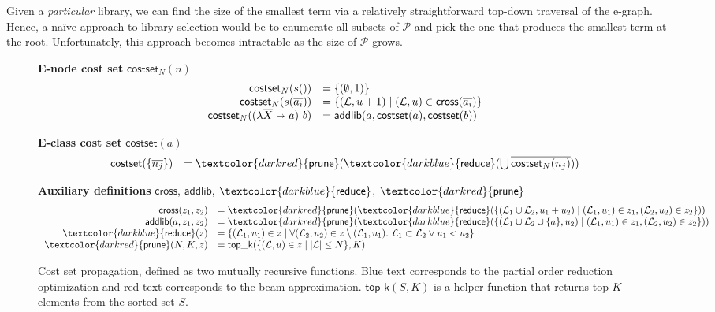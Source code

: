 \documentclass[acmsmall,screen,nonacm,review=false,timestamp=false]{acmart}
\newcommand{\many}[1]{\overline{#1}}
\newcommand{\bnd}{\ \mathbf{\shortrightarrow}\ }
\newcommand{\cs}{\mathsf{costset}} \newcommand{\subterms}{\mathsf{subterms}}
\newcommand{\patset}{\mathcal{P}}
\newcommand{\libset}{\mathcal{L}}
\newcommand{\sfunify}{\ensuremath{\textcolor{darkblue}{\mathsf{reduce}}}}
\newcommand{\sfprune}{\ensuremath{\textcolor{darkred}{\mathsf{prune}}}}
\newcommand{\sftopk}{\ensuremath{\mathsf{top\_k}}}
\begin{document}
Given a \emph{particular} library,
  we can find the size of the smallest term
  via a relatively straightforward top-down traversal of the e-graph.
Hence, a na\"ive approach to library selection
  would be to enumerate all subsets of $\patset$
  and pick the one that produces the smallest term at the root. 
Unfortunately, this approach becomes intractable as the size of $\patset$ grows.


\begin{figure}
  \textbf{E-node cost set} $\cs_N(n)$
  $$
  \begin{array}{rl}
    \cs_N(s()) &= \{ (\emptyset, 1) \} \\
    \cs_N(s(\many{a_i})) &= \{ (\libset, u + 1) \mid (\libset, u) \in \mathsf{cross}(\many{a_i}) \} \\
\cs_N((\lambda \many{X} \bnd a)\ b) &= \mathsf{addlib}(a, \cs(a), \cs(b)) \\
    \end{array}
  $$

  \textbf{E-class cost set} $\cs(a)$
  $$
  \begin{array}{rl}
    \cs(\{ \many{n_j} \}) &= \sfprune(\sfunify(\bigcup \many{\cs_N(n_j)})) \\
  \end{array}
  $$

  \textbf{Auxiliary definitions} $\mathsf{cross}$, $\mathsf{addlib}$, $\sfunify$, $\sfprune$
  $$
  \begin{array}{rl}
    \mathsf{cross}(z_1, z_2) &= \sfprune(\sfunify(\{ (\libset_1 \cup \libset_2, u_1 + u_2) \mid (\libset_1, u_1) \in z_1, (\libset_2, u_2) \in z_2 \})) \\
    \mathsf{addlib}(a, z_1, z_2) &= \sfprune(\sfunify(\{ (\libset_1 \cup \libset_2 \cup \{ a \}, u_2) \mid (\libset_1, u_1) \in z_1, (\libset_2, u_2) \in z_2 \})) \\
    \sfunify(z) &= \{ (\libset_1, u_1) \in z \mid \forall (\libset_2, u_2) \in z \setminus (\libset_1, u_1).\ \libset_1 \subset \libset_2 \lor u_1 < u_2 \} \\
    \sfprune(N, K, z) &=  \sftopk(\{(\libset, u) \in z \mid |\libset| \leq N \}, K)\\
  \end{array}
  $$
\caption{Cost set propagation, defined as two mutually
  recursive functions. Blue text corresponds to the partial order
  reduction optimization and red text corresponds to the beam approximation.
  $\sftopk(S, K)$ is a helper function that returns top $K$
  elements from the sorted set $S$.}
  \label{fig:costset}
\end{figure}
\end{document}
